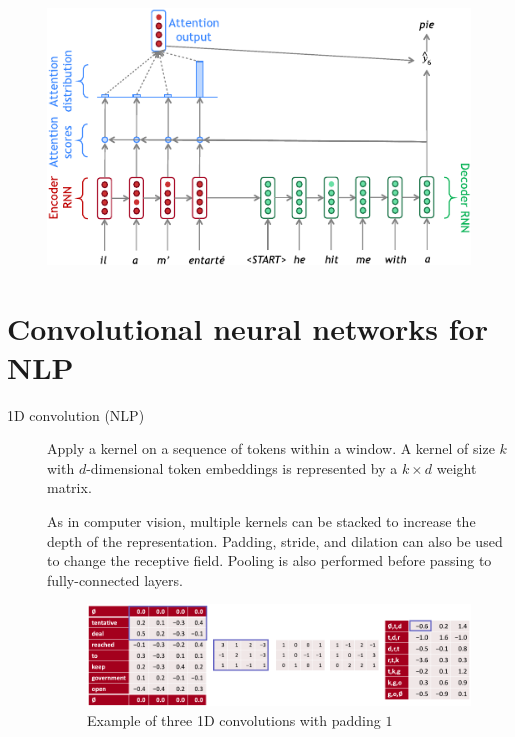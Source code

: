 \begin{description}
        \begin{figure}[H]
            \centering
            \includegraphics[width=0.6\linewidth]{./img/_rnn_attention.pdf}
        \end{figure}
\end{description}



\section{Convolutional neural networks for NLP}

\begin{description}
    \item[1D convolution (NLP)] 
        Apply a kernel on a sequence of tokens within a window. A kernel of size $k$ with $d$-dimensional token embeddings is represented by a $k \times d$ weight matrix.

        \begin{remark}
            As in computer vision, multiple kernels can be stacked to increase the depth of the representation. Padding, stride, and dilation can also be used to change the receptive field. Pooling is also performed before passing to fully-connected layers.
        \end{remark}

        \begin{figure}[H]
            \centering
            \includegraphics[width=0.8\linewidth]{./img/_1d_convolution.pdf}
            \caption{Example of three 1D convolutions with padding $1$}
        \end{figure}
\end{description}


